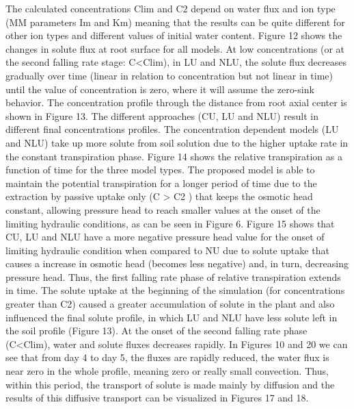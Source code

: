 The calculated concentrations Clim and C2 depend on water flux and ion type (MM parameters Im and Km) meaning that the results can be quite different for other ion types and different values of initial water content.
Figure 12 shows the changes in solute flux at root surface for all models. At low concentrations (or at the second falling rate stage: C<Clim), in LU and NLU, the solute flux decreases gradually over time (linear in relation to concentration but not linear in time) until the value of concentration is zero, where it will assume the zero-sink behavior.
The concentration profile through the distance from root axial center is shown in Figure 13. The different approaches (CU, LU and NLU) result in different final concentrations profiles. The concentration dependent models (LU and NLU) take up more solute from soil solution due to the higher uptake rate in the constant transpiration phase.
Figure 14 shows the relative transpiration as a function of time for the three model types. The proposed model is able to maintain the potential transpiration for a longer period of time due to the extraction by passive uptake only (C > C2 ) that keeps the osmotic head constant, allowing pressure head to reach smaller values at the onset of the limiting hydraulic conditions, as can be seen in Figure 6.
Figure 15 shows that CU, LU and NLU have a more negative pressure head value for the onset of limiting hydraulic condition when compared to NU due to solute uptake that causes a increase in osmotic head (becomes less negative) and, in turn, decreasing pressure head. Thus, the first falling rate phase of relative transpiration extends in time. The solute uptake at the beginning of the simulation (for concentrations greater than C2) caused a greater accumulation of solute in the plant and also influenced the final solute profile, in which LU and NLU have less solute left in the soil profile (Figure 13).
At the onset of the second falling rate phase (C<Clim), water and solute fluxes decreases rapidly. In Figures 10 and 20 we can see that from day 4 to day 5, the fluxes are rapidly reduced, the water flux is near zero in the whole profile, meaning zero or really small convection. Thus, within this period, the transport of solute is made mainly by diffusion and the results of this diffusive transport can be visualized in Figures 17 and 18.




